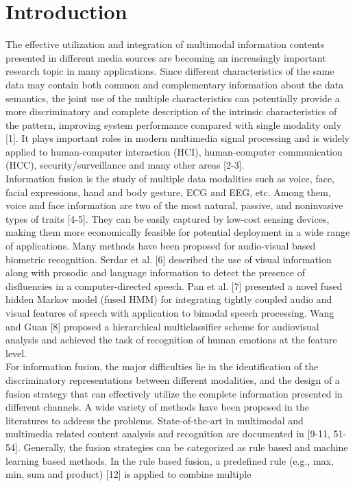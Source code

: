 \documentclass[journal]{IEEEtran}
\begin{document}
\section{Introduction}
%
%
%
%
The effective utilization and integration of multimodal information contents presented in different media sources are becoming an increasingly important research topic in many applications. Since different characteristics of the same data may contain both common and complementary information about the data semantics, the joint use of the multiple characteristics can potentially provide a more discriminatory and complete description of the intrinsic characteristics of the pattern, improving system performance compared with single modality only [1]. It plays important roles in modern multimedia signal processing and is widely applied to human-computer interaction (HCI), human-computer communication (HCC), security/surveillance and many other areas [2-3].\\\indent Information fusion is the study of multiple data modalities such as voice, face, facial expressions, hand and body gesture, ECG and EEG, etc. Among them, voice and face information are two of the most natural, passive, and noninvasive types of traits [4-5]. They can be easily captured by low-cost sensing devices, making them more economically feasible for potential deployment in a wide range of applications. Many methods have been proposed for audio-visual based biometric recognition. Serdar et al. [6] described the use of visual information along with prosodic and language information to detect the presence of disfluencies in a computer-directed speech. Pan et al. [7] presented a novel fused hidden Markov model (fused HMM) for integrating tightly coupled audio and visual features of speech with application to bimodal speech processing. Wang and Guan [8] proposed a hierarchical multiclassifier scheme for audiovisual analysis and achieved the task of recognition of human emotions at the feature level. \\\indent For information fusion, the major difficulties lie in the identification of the discriminatory representations between different modalities, and the design of a fusion strategy that can effectively utilize the complete information presented in different channels. A wide variety of methods have been proposed in the literatures to address the problems. State-of-the-art in multimodal and multimedia related content analysis and recognition are documented in [9-11, 51-54]. Generally, the fusion strategies can be categorized as rule based and machine learning based methods. In the rule based fusion, a predefined rule (e.g., max, min, sum and product) [12] is applied to combine multiple 
\end{document}
